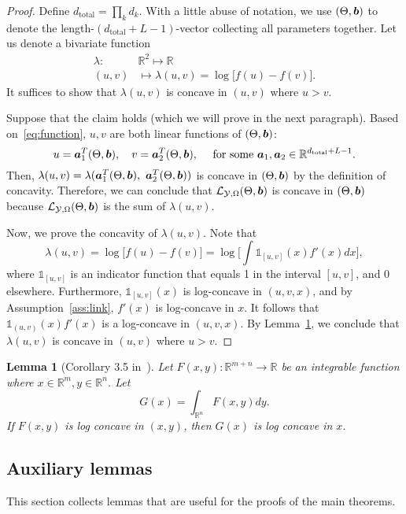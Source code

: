 \documentclass[11pt]{article}
\theoremstyle{plain}
\newtheorem{lem}{Lemma}
\theoremstyle{definition}
\begin{document}
\begin{proof}
Define $d_{\text{total}}=\prod_k d_k$. With a little abuse of notation, we use $(\Theta,\bm{b})$ to denote the length-$(d_{\text{total}}+L-1)$-vector collecting all parameters together. Let us denote a bivariate function
\begin{align}
\lambda: &\mathbb{R}^2\mapsto \mathbb{R}\\
(u,v)&\mapsto\lambda(u,v) = \log \big[f(u)-  f(v)\big].
\end{align}
It suffices to show that $\lambda(u,v)$ is concave in $(u,v)$ where $u>v$. 

Suppose that the claim holds (which we will prove in the next paragraph). Based on~\eqref{eq:function}, $u,v$ are both linear functions of $(\Theta,\bm{b})$:
\[
u = \bm{a}_1^T(\Theta,\bm{b}), \quad v = \bm{a}_2^T(\Theta,\bm{b}), \quad \text{ for some}\ \bm{a}_1,\bm{a}_2\in \mathbb{R}^{d_{\text{total}}+L-1}.
\]
Then, $\lambda(u,v) = \lambda(\ma_1^T(\Theta,\mb),\ \ma_2^T(\Theta,\mb))$ is concave in $(\Theta,\bm{b})$ by the definition of concavity. Therefore, we can conclude that $\mathcal{L}_{\mathcal{Y},\Omega}(\Theta, \bm{b}) $ is concave in $(\Theta,\bm{b})$ because $\mathcal{L}_{\mathcal{Y},\Omega}(\Theta, \bm{b})$ is the sum of $\lambda(u,v)$. 

Now, we prove the concavity of $\lambda(u,v)$. Note that
\begin{equation}
\lambda(u,v) = \log\big[f(u)-f(v)\big]=\log\big[\int\mathds{1}_{[u,v]}(x)f'(x)dx\big],
\end{equation}
where $\mathds{1}_{[u,v]}$ is an indicator function that equals 1 in the interval $[u,v]$, and 0 elsewhere. Furthermore, $\mathds{1}_{[u,v]}(x)$ is log-concave in $(u,v,x)$, and by Assumption~\ref{ass:link}, $f'(x)$ is log-concave in $x$. It follows that $\mathds{1}_{(u,v)}(x)f'(x)$
is a log-concave in $(u,v,x)$. By Lemma~\ref{lem:lossconvexity}, we conclude that $\lambda(u,v)$ is concave in $(u,v)$ where $u>v$. 
\end{proof}

\begin{lem}[Corollary 3.5 in~\cite{brascamp2002extensions}]\label{lem:lossconvexity}
Let $F(x,y):\mathbb{R}^{m+n}\rightarrow \mathbb{R}$ be an integrable function where $x\in \mathbb{R}^{m},y\in \mathbb{R}^n$. Let 
\[
G(x) = \int_{\mathbb{R}^n}F(x,y)dy.
\]
If $F(x,y)$ is log concave in $(x,y)$, then $G(x)$ is log concave in $x$.
\end{lem}


\subsection{Auxiliary lemmas}
\label{sec:lemma}
This section collects lemmas that are useful for the proofs of the main theorems. 
\end{document}
